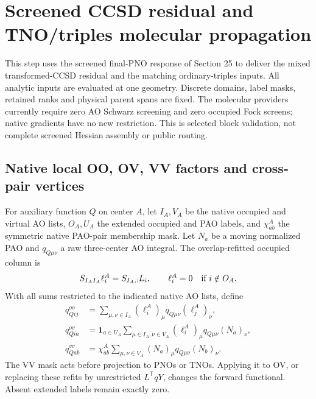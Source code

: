 \documentclass[11pt]{article}
\begin{document}
\section{Screened CCSD residual and TNO/triples molecular propagation}
This step uses the screened final-PNO response of Section 25 to deliver the
mixed transformed-CCSD residual and the matching ordinary-triples inputs.
All analytic inputs are evaluated at one geometry. Discrete domains, label
masks, retained ranks and physical parent spans are fixed. The molecular
providers currently require zero AO Schwarz screening and zero occupied
Fock screens; native gradients have no new restriction. This is selected
block validation, not complete screened Hessian assembly or public routing.

\subsection{Native local OO, OV, VV factors and cross-pair vertices}
For auxiliary function $Q$ on center $A$, let $I_A,V_A$ be the native
occupied and virtual AO lists, $O_A,U_A$ the extended occupied and PAO labels,
and $\chi^A_{ab}$ the symmetric native PAO-pair membership mask. Let $N_a$
be a moving normalized PAO and $q_{Q\mu\nu}$ a raw three-center AO integral.
The overlap-refitted occupied column is
\begin{equation}
 S_{I_AI_A}\ell_i^A=S_{I_A,:}L_i,\qquad
 \ell_i^A=0\quad\hbox{if }i\notin O_A.
\end{equation}
With all sums restricted to the indicated native AO lists, define
\begin{align}
 q^{oo}_{Qij}&=\sum_{\mu,\nu\in I_A}
       (\ell_i^A)_\mu q_{Q\mu\nu}(\ell_j^A)_\nu,\\
 q^{ov}_{Qia}&=\mathbf1_{a\in U_A}\sum_{\mu\in I_A,\nu\in V_A}
       (\ell_i^A)_\mu q_{Q\mu\nu}(N_a)_\nu,\\
 q^{vv}_{Qab}&=\chi^A_{ab}\sum_{\mu,\nu\in V_A}
       (N_a)_\mu q_{Q\mu\nu}(N_b)_\nu.
\end{align}
The VV mask acts before projection to PNOs or TNOs. Applying it to OV, or
replacing these refits by unrestricted $L^{\mathsf T}qY$, changes the
forward functional. Absent extended labels remain exactly zero.
\end{document}
